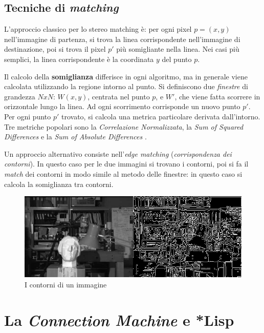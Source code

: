 \documentclass[12pt,a4paper,openright,twoside]{report}
\begin{document}
\section{Tecniche di \textit{matching}}

L'approccio classico per lo stereo matching è: per ogni pixel $p = (x, y)$ nell'immagine di partenza, si trova la linea corrispondente nell'immagine di destinazione, poi si trova il pixel $p'$ più somigliante nella linea. Nei casi più semplici, la linea corrispondente è la coordinata $y$ del punto $p$.

Il calcolo della \textbf{somiglianza} differisce in ogni algoritmo, ma in generale viene calcolata utilizzando la regione intorno al punto. Si definiscono due \textit{finestre} di grandezza $NxN$: $W (x, y)$, centrata nel punto $p$, e $W'$, che viene fatta scorrere in orizzontale lungo la linea. Ad ogni scorrimento corrisponde un nuovo punto $p'$. Per ogni punto $p'$ trovato, si calcola una metrica particolare derivata dall'intorno. Tre metriche popolari sono la \textit{Correlazione Normalizzata}, la \textit{Sum of Squared Differences} e la \textit{Sum of Absolute Differences} \cite{stereomatchingalgos}.

Un approccio alternativo consiste nell'\textit{edge matching} (\textit{corrispondenza dei contorni}). In questo caso per le due immagini si trovano i contorni, poi si fa il \textit{match} dei contorni in modo simile al metodo delle finestre: in questo caso si calcola la somiglianza tra contorni.

\begin{figure}[h]
    \centering
    \includegraphics[width=\textwidth]{contours.png}
    \caption{I contorni di un immagine}
    \label{img:contours}
\end{figure}



\chapter{La \textit{Connection Machine} e *Lisp}
\end{document}
